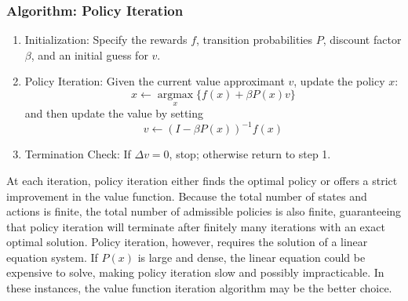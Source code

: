 \documentclass[\topdir/lecture\_notes.tex]{subfiles}
\begin{document}
\subsubsection{Algorithm: Policy Iteration}
\begin{enumerate}
\item Initialization: Specify the rewards $f$, transition probabilities $P$, discount factor $\beta$, and an initial guess for $v$.

  \item Policy Iteration: Given the current value approximant $v$, update the policy $x$:
    \begin{equation*}
    x \leftarrow \underset{x}{\operatorname{argmax}}\{f(x)+\beta P(x) v\}
    \end{equation*}
    and then update the value by setting      
    \begin{equation*}
        v \leftarrow(I-\beta P(x))^{-1} f(x)
    \end{equation*}
  \item Termination Check: If $\Delta v=0$, stop; otherwise return to step 1.
\end{enumerate}

At each iteration, policy iteration either finds the optimal policy or offers a strict improvement in the value function. Because the total number of states and actions is finite, the total number of admissible policies is also finite, guaranteeing that policy iteration will terminate after finitely many iterations with an exact optimal solution. Policy iteration, however, requires the solution of a linear equation system. If $P(x)$ is large and dense, the linear equation could be expensive to solve, making policy iteration slow and possibly impracticable. In these instances, the value function iteration algorithm may be the better choice.
\end{document}
